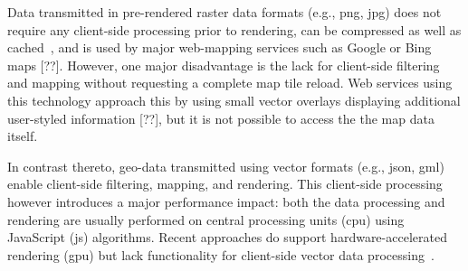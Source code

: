 
    Data transmitted in pre-rendered raster data formats (e.g., \acrshort{png},
    \acrshort{jpg}) does
    not require any client-side processing prior to rendering, can be compressed
    as well as cached~\cite{ESRI2006}, and is used by major web-mapping services
    such as Google or Bing maps [??]. However, one major disadvantage is the
    lack for client-side filtering and mapping without requesting a complete map
    tile reload. Web services using this technology approach this by using small
    vector overlays displaying additional user-styled information [??], but it
    is not possible to access the the map data itself.\par

    In contrast thereto, geo-data transmitted using vector formats
    (e.g., \acrshort{json}, \acrshort{gml}) enable
    client-side filtering, mapping, and rendering. This client-side processing
    however introduces a major performance impact: both the data processing and
    rendering are usually performed on central processing units (\acrshort{cpu})
    using JavaScript (\acrshort{js}) algorithms. Recent approaches do support
    hardware-accelerated rendering (\acrshort{gpu}) but lack functionality for
    client-side vector data processing~\cite{Gaffuri2012}.\par


